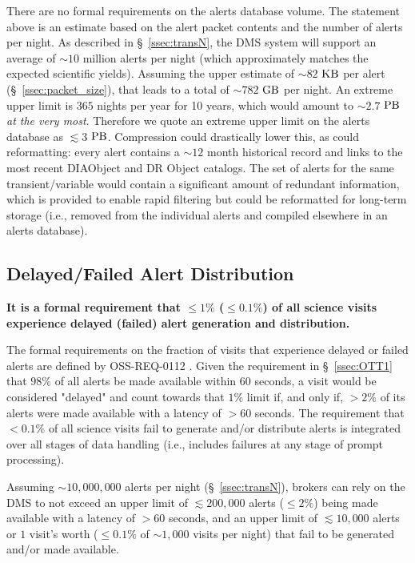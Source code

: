 \documentclass[DM,authoryear,toc]{lsstdoc}
\begin{document}
There are no formal requirements on the alerts database volume. The statement above is an estimate based on the alert packet contents and the number of alerts per night. As described in \S~\ref{ssec:transN}, the DMS system will support an average of $\sim10$ million alerts per night (which approximately matches the expected scientific yields). Assuming the upper estimate of $\sim82$ $\rm KB$ per alert (\S~\ref{ssec:packet_size}), that leads to a total of $\sim782$ $\rm GB$ per night. An extreme upper limit is $365$ nights per year for 10 years, which would amount to $\sim2.7$ $\rm PB$ {\it at the very most}. Therefore we quote an extreme upper limit on the alerts database as $\lesssim3$ $\rm PB$. Compression could drastically lower this, as could reformatting: every alert contains a $\sim12$ month historical record and links to the most recent DIAObject and DR Object catalogs. The set of alerts for the same transient/variable would contain a significant amount of redundant information, which is provided to enable rapid filtering but could be reformatted for long-term storage (i.e., removed from the individual alerts and compiled elsewhere in an alerts database). 


\subsection{Delayed/Failed Alert Distribution}\label{ssec:OTR1}

{\bf It is a formal requirement that $\leq1\%$ ($\leq0.1\%$) of all science visits experience delayed (failed) alert generation and distribution.}

The formal requirements on the fraction of visits that experience delayed or failed alerts are defined by OSS-REQ-0112 . Given the requirement in \S~\ref{ssec:OTT1} that $98\%$ of all alerts be made available within $60$ seconds, a visit would be considered "delayed" and count towards that $1\%$ limit if, and only if, $>2\%$ of its alerts were made available with a latency of $>60$ seconds. The requirement that $<0.1\%$ of all science visits fail to generate and/or distribute alerts is integrated over all stages of data handling (i.e., includes failures at any stage of prompt processing).

Assuming $\sim10,000,000$ alerts per night (\S~\ref{ssec:transN}), brokers can rely on the DMS to not exceed an upper limit of $\lesssim 200,000$ alerts ($\leq 2\%$) being made available with a latency of $>60$ seconds, and an upper limit of $\lesssim 10,000$ alerts or $1$ visit's worth ($\leq0.1\%$ of $\sim1,000$ visits per night) that fail to be generated and/or made available.
\end{document}
